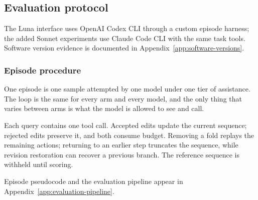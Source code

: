 \subsection{Evaluation protocol}
\label{sec:experiments}

The Luna interface uses OpenAI Codex CLI \citep{openai-codex} through a custom
episode harness; the added Sonnet experiments use Claude Code CLI with the same task tools. Software version evidence is documented in
Appendix~\ref{app:software-versions}.

\subsubsection{Episode procedure}
\label{sec:exp-pipeline}

One episode is one sample attempted by one model under one tier of assistance. The loop is the same
for every arm and every model, and the only thing that varies between arms is what the model is
allowed to see and call.

Each query contains one tool call. Accepted edits update the current sequence;
rejected edits preserve it, and both consume budget. Removing a fold replays the remaining actions;
returning to an earlier step truncates the sequence, while revision restoration can recover a
previous branch. The reference sequence is withheld until scoring.

Episode pseudocode and the evaluation pipeline appear in
Appendix~\ref{app:evaluation-pipeline}.

